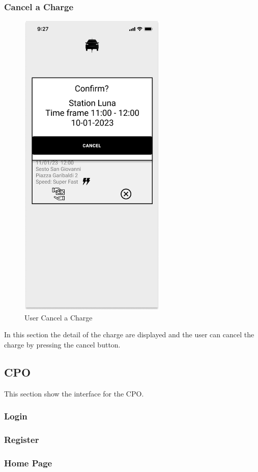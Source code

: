 \subsubsection{Cancel a Charge}
\begin{figure}[H]
    \centering
    \includegraphics[keepaspectratio, height=15cm]{AppInterface/Delete Charge.png}
    \caption{User Cancel a Charge}
    \label{pop:Delete}
\end{figure}
In this section the detail of the charge are displayed and the user can cancel the charge by pressing the cancel button.
\subsection{CPO}
This section show the interface for the \ac{CPO}.
\subsubsection{Login}
\subsubsection{Register}
\subsubsection{Home Page}

\clearpage